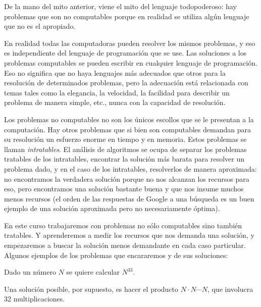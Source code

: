 De la mano del mito anterior, viene el mito del lenguaje
todopoderoso: hay problemas que son no computables porque en
realidad se utiliza algún lenguaje que no es el apropiado.

En realidad todas las computadoras pueden resolver los mismos
problemas, y eso es independiente del lenguaje de programación que
se use. Las soluciones a los problemas computables se pueden
escribir en cualquier lenguaje de programación. Eso no significa
que no haya lenguajes más adecuados que otros para la resolución
de determinados problemas, pero la adecuación está relacionada con
temas tales como la elegancia, la velocidad, la facilidad para
describir un problema de manera simple, etc., nunca con la
capacidad de resolución.

Los problemas no computables no son los únicos escollos que se le
presentan a la computación. Hay otros problemas que si bien son
computables demandan para su resolución un esfuerzo enorme en
tiempo y en memoria. Estos problemas se llaman \emph{intratables}.
El análisis de algoritmos se ocupa de separar los problemas
tratables de los intratables, encontrar la solución más barata
para resolver un problema dado, y en el caso de los intratables,
resolverlos de manera aproximada: no encontramos la verdadera
solución porque no nos alcanzan los recursos para eso, pero
encontramos una solución bastante buena y que nos insume muchos
menos recursos (el orden de las respuestas de Google a una
búsqueda es un buen ejemplo de una solución aproximada pero no
necesariamente óptima).

En este curso trabajaremos con problemas no sólo computables sino
también tratables. Y aprenderemos a medir los recursos que nos
demanda una solución, y empezaremos a buscar la solución menos
demandante en cada caso particular. \\

Algunos ejemplos de los problemas que encararemos y de sus
soluciones:

\begin{problemac}
Dado un número $N$ se quiere calcular $N^{33}$.
\end{problemac}

Una solución posible, por supuesto, es hacer el producto $N \cdot
N \cdots N$, que involucra 32 multiplicaciones.

